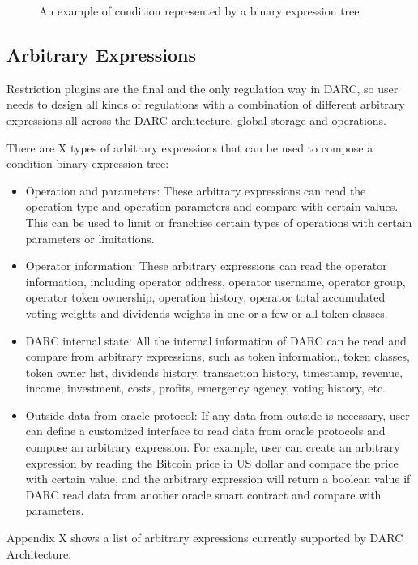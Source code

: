 \documentclass[main.tex]{subfiles}
\begin{document}
\begin{figure}
    \centering
{}
    \caption{An example of condition represented by a binary expression tree}
    \label{fig:my_label}
\end{figure}


\subsection{Arbitrary Expressions}

Restriction plugins are the final and the only regulation way in DARC, so user needs to design all kinds of regulations with a combination of different arbitrary expressions all across the DARC architecture, global storage and operations. 

There are X types of arbitrary expressions that can be used to compose a condition binary expression tree:

\begin{itemize}
    \item Operation and parameters: These arbitrary expressions can read the operation type and operation parameters and compare with certain values. This can be used to limit  or franchise certain types of operations with certain parameters or limitations. 
    \item Operator information: These arbitrary expressions can read the operator information, including operator address, operator username, operator group, operator token ownership, operation history, operator total accumulated voting weights and dividends weights in one or a few or all token classes.
    \item DARC internal state: All the internal information of DARC can be read and compare from arbitrary expressions, such as token information, token classes, token owner list, dividends history, transaction history, timestamp, revenue, income, investment, costs, profits, emergency agency, voting history, etc.
    \item Outside data from oracle protocol: If any data from outside is necessary, user can define a customized interface to read data from oracle protocols and compose an arbitrary expression. For example, user can create an arbitrary expression by reading the Bitcoin price in US dollar and compare the price with certain value, and the arbitrary expression will return a boolean value if DARC read data from another oracle smart contract and compare with parameters.
\end{itemize}

Appendix X shows a list of arbitrary expressions currently supported by DARC Architecture.
\end{document}
